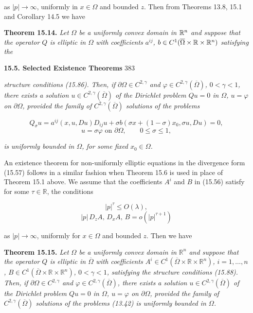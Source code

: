 as $|p| \to \infty$, uniformly in $x \in \Omega$ and bounded $z$. Then from Theorems 13.8, 15.1
and Corollary 14.5 we have

\medskip

\noindent\textbf{Theorem 15.14.} \emph{Let $\Omega$ be a uniformly convex domain in $\mathbb{R}^n$ and suppose that the
operator $Q$ is elliptic in $\Omega$ with coefficients $a^{ij}$, $b \in C^1(\overline{\Omega} \times \mathbb{R} \times \mathbb{R}^n)$ satisfying the}


\textbf{15.5. Selected Existence Theorems} \hfill 383

\smallskip

\emph{structure conditions (15.86). Then, if $\partial \Omega \in C^{2,\gamma}$ and $\varphi \in C^{2,\gamma}(\overline{\Omega})$, $0<\gamma<1$, there exists a solution $u \in C^{2,\gamma}(\overline{\Omega})$ of the Dirichlet problem $Qu=0$ in $\Omega$, $u=\varphi$ on $\partial \Omega$, provided the family of $C^{2,\gamma}(\overline{\Omega})$ solutions of the problems}

\[
\tag{15.87}
Q_\sigma u = a^{ij}(x,u,Du)D_{ij}u + \sigma b(\sigma x + (1-\sigma)x_0,\sigma u,Du)=0,
\]
\[
u=\sigma\varphi \text{ on } \partial \Omega,\qquad 0\le \sigma \le 1,
\]

\noindent \emph{is uniformly bounded in $\Omega$, for some fixed $x_0\in\Omega$.}

\medskip

An existence theorem for non-uniformly elliptic equations in the divergence form (15.57) follows in a similar fashion when Theorem 15.6 is used in place of Theorem 15.1 above. We assume that the coefficients $A^i$ and $B$ in (15.56) satisfy for some $\tau\in\mathbb{R}$, the conditions

\[
|p|^\tau \le O(\lambda),
\]
\[
\tag{15.88}
|p|\,D_z A,\, D_x A,\, B = o(|p|^{\tau+1})
\]

\noindent as $|p|\to\infty$, uniformly for $x\in\Omega$ and bounded $z$. Then we have

\medskip

\textbf{Theorem 15.15.} \emph{Let $\Omega$ be a uniformly convex domain in $\mathbb{R}^n$ and suppose that the operator $Q$ is elliptic in $\overline{\Omega}$ with coefficients $A^i\in C^1(\overline{\Omega}\times\mathbb{R}\times\mathbb{R}^n)$, $i=1,\ldots,n$, $B\in C^1(\overline{\Omega}\times\mathbb{R}\times\mathbb{R}^n)$, $0<\gamma<1$, satisfying the structure conditions (15.88). Then, if $\partial\Omega\in C^{2,\gamma}$ and $\varphi\in C^{2,\gamma}(\overline{\Omega})$, there exists a solution $u\in C^{2,\gamma}(\overline{\Omega})$ of the Dirichlet problem $Qu=0$ in $\Omega$, $u=\varphi$ on $\partial\Omega$, provided the family of $C^{2,\gamma}(\overline{\Omega})$ solutions of the problems (13.42) is uniformly bounded in $\Omega$.}

